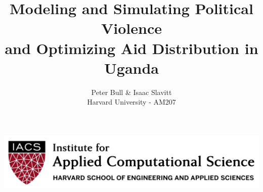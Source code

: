 \documentclass[a0,final]{a0poster}
\title{Modeling and Simulating Political Violence\\and Optimizing Aid Distribution in Uganda}
\author{Peter Bull \& Isaac Slavitt\\
Harvard University - AM207}
\begin{document}
\hspace{-3cm}								%
\colorbox{boxcol}{						%
\begin{minipage}{600mm}
\maketitle
\end{minipage}
\begin{minipage}{575mm}					%
\includegraphics[width=1\textwidth,right]{iacs_logo.png}
\end{minipage}}

\vspace{1cm}
\end{document}
